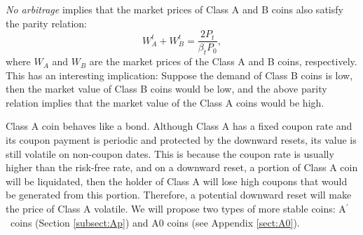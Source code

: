 \documentclass[draft, noinfoline]{ectaart}
\numberwithin{equation}{section}
\theoremstyle{plain}
\newcommand{\Ap}{A\ensuremath{^\prime}~}
\begin{document}
{\it No arbitrage} implies that the market prices of Class A and B coins also satisfy the parity relation:
$$W_A^t +W_B^t=\frac{2 P_t}{\beta_t P_0},$$
where $W_A$ and $W_B$ are the market prices of the Class A and B coins, respectively. This has an interesting implication: Suppose the demand of Class B coins is low, then the market value of Class B coins would be low, and the above parity relation implies that the market value of the Class A coins would be high.


Class A coin behaves like a bond. Although Class A has a fixed coupon rate and its coupon payment is periodic and protected by the downward resets, its value is still volatile on non-coupon dates.
This is because the coupon rate is usually higher than the risk-free rate, and on a downward reset, a portion of Class A coin will be liquidated, then the holder of Class A will lose high coupons that would be generated from this portion. Therefore, a potential downward reset will make the price of Class A volatile. We will propose two types of more stable coins: \Ap coins (Section \ref{subsect:Ap}) and A0 coins (see Appendix \ref{sect:A0}).
\end{document}
